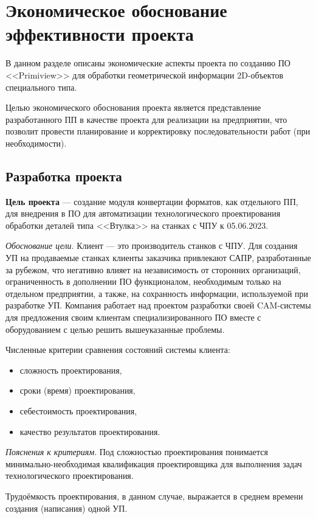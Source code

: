 \chapter{Экономическое обоснование эффективности проекта}
\label{cha:wirtsch}

В данном разделе описаны экономические аспекты проекта по созданию ПО <<Primiview>> для обработки геометрической информации 2D-объектов специального типа.

Целью экономического обоснования проекта является представление разработанного ПП в качестве проекта для реализации на предприятии, что позволит провести планирование и корректировку последовательности работ (при необходимости).

\section{Разработка проекта}

\textbf{Цель проекта} --- создание модуля конвертации форматов, как отдельного ПП, для внедрения в ПО для автоматизации технологического проектирования обработки деталей типа <<Втулка>> на станках с ЧПУ к 05.06.2023.

\textit{Обоснование цели}. Клиент --- это производитель станков с ЧПУ. Для создания УП на продаваемые станках клиенты заказчика привлекают САПР, разработанные за рубежом, что негативно влияет на независимость от сторонних организаций, ограниченность в дополнении ПО функционалом, необходимым только на отдельном предприятии, а также, на сохранность информации, используемой при разработке УП. Компания работает над проектом разработки своей CAM-системы для предложения своим клиентам специализированного ПО вместе с оборудованием с целью решить вышеуказанные проблемы. 

Численные критерии сравнения состояний системы клиента:
\begin{itemize}
	\item сложность проектирования,
	\item сроки (время) проектирования,
	\item себестоимость проектирования,
	\item качество результатов проектирования.
\end{itemize}

\textit{Пояснения к критериям}. Под сложностью проектирования понимается минимально-необходимая квалификация проектировщика для выполнения задач технологического проектирования.

Трудоёмкость проектирования, в данном случае, выражается в среднем времени создания (написания) одной УП.

